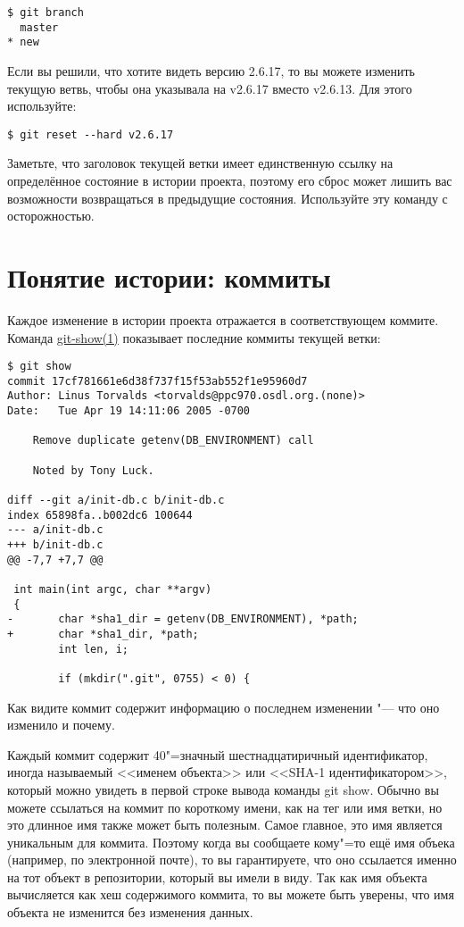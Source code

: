 \documentclass[a4paper, 11pt]{report}
\begin{document}
\begin{lstlisting}
$ git branch
  master
* new
\end{lstlisting}

Если вы решили, что хотите видеть версию 2.6.17, то вы можете изменить текущую ветвь,
чтобы она указывала на v2.6.17 вместо v2.6.13. Для этого используйте:

\begin{lstlisting}
$ git reset --hard v2.6.17
\end{lstlisting}

Заметьте, что заголовок текущей ветки имеет единственную ссылку на определённое состояние
в истории проекта, поэтому его сброс может лишить вас возможности возвращаться в
предыдущие состояния. Используйте эту команду с осторожностью.


\section{Понятие истории: коммиты}

Каждое изменение в истории проекта отражается в соответствующем коммите. Команда
\href{http://www.kernel.org/pub/software/scm/git/docs/git-show.html}{git-show(1)}
показывает последние коммиты текущей ветки:

\begin{lstlisting}
$ git show
commit 17cf781661e6d38f737f15f53ab552f1e95960d7
Author: Linus Torvalds <torvalds@ppc970.osdl.org.(none)>
Date:   Tue Apr 19 14:11:06 2005 -0700

    Remove duplicate getenv(DB_ENVIRONMENT) call

    Noted by Tony Luck.

diff --git a/init-db.c b/init-db.c
index 65898fa..b002dc6 100644
--- a/init-db.c
+++ b/init-db.c
@@ -7,7 +7,7 @@

 int main(int argc, char **argv)
 {
-       char *sha1_dir = getenv(DB_ENVIRONMENT), *path;
+       char *sha1_dir, *path;
        int len, i;

        if (mkdir(".git", 0755) < 0) {
\end{lstlisting}

Как видите коммит содержит информацию о последнем изменении "--- что оно изменило
и почему.

Каждый коммит содержит 40"=значный шестнадцатиричный идентификатор, иногда называемый
<<именем объекта>> или <<SHA-1 идентификатором>>, который можно увидеть в первой
строке вывода команды \textsf{git show}. Обычно вы можете ссылаться на коммит по
короткому имени, как на тег или имя ветки, но это длинное имя также может быть
полезным. Самое главное, это имя является уникальным для коммита. Поэтому когда
вы сообщаете кому"=то ещё имя объека (например, по электронной почте), то вы
гарантируете, что оно ссылается именно на тот объект в репозитории, который вы
имели в виду. Так как имя объекта вычисляется как хеш содержимого коммита, то вы
можете быть уверены, что имя объекта не изменится без изменения данных.
\end{document}
